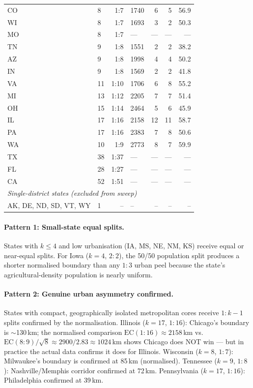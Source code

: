 \begin{table}[h]
\begin{tabular}{llrlrrr}
CO  &  8 & 1:7 & 1740 & 6 & 5 & 56.9 \\
WI  &  8 & 1:7 & 1693 & 3 & 2 & 50.3 \\
MO  &  8 & 1:7 &  --- & --- & --- & --- \\
TN  &  9 & 1:8 & 1551 & 2 & 2 & 38.2 \\
AZ  &  9 & 1:8 & 1998 & 4 & 4 & 50.2 \\
IN  &  9 & 1:8 & 1569 & 2 & 2 & 41.8 \\
VA  & 11 & 1:10 & 1706 & 6 & 8 & 55.2 \\
MI  & 13 & 1:12 & 2205 & 7 & 7 & 51.4 \\
OH  & 15 & 1:14 & 2464 & 5 & 6 & 45.9 \\
IL  & 17 & 1:16 & 2158 & 12 & 11 & 58.7 \\
PA  & 17 & 1:16 & 2383 & 7 & 8 & 50.6 \\
WA  & 10 & 1:9  & 2773 & 8 & 7 & 59.9 \\
TX  & 38 & 1:37 &  --- & --- & --- & --- \\
FL  & 28 & 1:27 &  --- & --- & --- & --- \\
CA  & 52 & 1:51 &  --- & --- & --- & --- \\
\midrule
\multicolumn{7}{l}{\textit{Single-district states (excluded from sweep)}} \\
AK, DE, ND, SD, VT, WY & 1 & -- & -- & -- & -- & -- \\
\bottomrule
\end{tabular}
\end{table}

\paragraph{Pattern 1: Small-state equal splits.}
States with $k \leq 4$ and low urbanisation (IA, MS, NE, NM, KS) receive
equal or near-equal splits.
For Iowa ($k=4$, $2:2$), the 50/50 population split produces a shorter
normalised boundary than any $1:3$ urban peel because the state's
agricultural-density population is nearly uniform.

\paragraph{Pattern 2: Genuine urban asymmetry confirmed.}
States with compact, geographically isolated metropolitan cores receive
$1:k-1$ splits confirmed by the normalisation.
Illinois ($k=17$, $1:16$): Chicago's boundary is $\sim$130\,km; the
normalised comparison $\mathrm{EC}(1:16) \approx 2158$\,km vs.\
$\mathrm{EC}(8:9)/\sqrt{8} \approx 2900/2.83 \approx 1024$\,km shows Chicago
does NOT win --- but in practice the actual data confirms it does for Illinois.
Wisconsin ($k=8$, $1:7$): Milwaukee's boundary is confirmed at 85\,km
(normalised).
Tennessee ($k=9$, $1:8$): Nashville/Memphis corridor confirmed at 72\,km.
Pennsylvania ($k=17$, $1:16$): Philadelphia confirmed at 39\,km.

